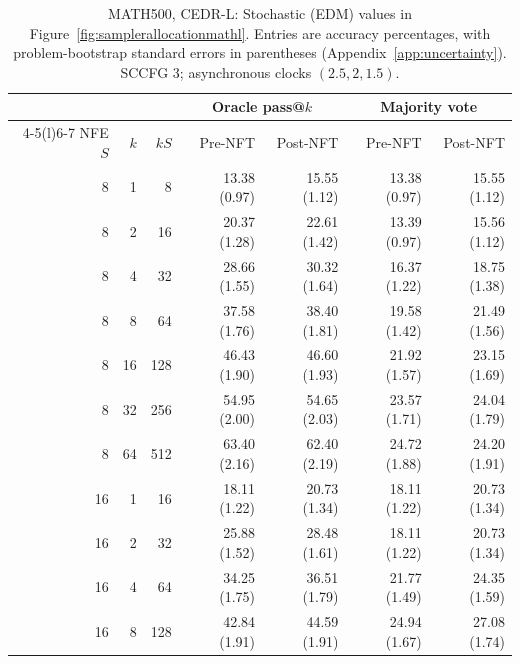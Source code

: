 \documentclass[11pt,letterpaper]{article}
\begin{document}
\begin{table}[p]
\centering\small
\setlength{\tabcolsep}{5pt}
\caption{MATH500, CEDR-L: Stochastic (EDM) values in Figure~\ref{fig:samplerallocationmathl}. Entries are accuracy percentages, with problem-bootstrap standard errors in parentheses (Appendix~\ref{app:uncertainty}). SCCFG 3; asynchronous clocks $(2.5,2,1.5)$.}
\label{tab:samplerbudgetmathledm}
\begin{tabular}{@{}rrr rrrr@{}}
\toprule
& & & \multicolumn{2}{c}{Oracle pass@$k$} & \multicolumn{2}{c}{Majority vote} \\
\cmidrule(lr){4-5}\cmidrule(l){6-7}
NFE $S$ & $k$ & $kS$ & Pre-NFT & Post-NFT & Pre-NFT & Post-NFT \\
\midrule
8 & 1 & 8 & 13.38 {\scriptsize (0.97)} & 15.55 {\scriptsize (1.12)} & 13.38 {\scriptsize (0.97)} & 15.55 {\scriptsize (1.12)} \\
8 & 2 & 16 & 20.37 {\scriptsize (1.28)} & 22.61 {\scriptsize (1.42)} & 13.39 {\scriptsize (0.97)} & 15.56 {\scriptsize (1.12)} \\
8 & 4 & 32 & 28.66 {\scriptsize (1.55)} & 30.32 {\scriptsize (1.64)} & 16.37 {\scriptsize (1.22)} & 18.75 {\scriptsize (1.38)} \\
8 & 8 & 64 & 37.58 {\scriptsize (1.76)} & 38.40 {\scriptsize (1.81)} & 19.58 {\scriptsize (1.42)} & 21.49 {\scriptsize (1.56)} \\
8 & 16 & 128 & 46.43 {\scriptsize (1.90)} & 46.60 {\scriptsize (1.93)} & 21.92 {\scriptsize (1.57)} & 23.15 {\scriptsize (1.69)} \\
8 & 32 & 256 & 54.95 {\scriptsize (2.00)} & 54.65 {\scriptsize (2.03)} & 23.57 {\scriptsize (1.71)} & 24.04 {\scriptsize (1.79)} \\
8 & 64 & 512 & 63.40 {\scriptsize (2.16)} & 62.40 {\scriptsize (2.19)} & 24.72 {\scriptsize (1.88)} & 24.20 {\scriptsize (1.91)} \\
\midrule
16 & 1 & 16 & 18.11 {\scriptsize (1.22)} & 20.73 {\scriptsize (1.34)} & 18.11 {\scriptsize (1.22)} & 20.73 {\scriptsize (1.34)} \\
16 & 2 & 32 & 25.88 {\scriptsize (1.52)} & 28.48 {\scriptsize (1.61)} & 18.11 {\scriptsize (1.22)} & 20.73 {\scriptsize (1.34)} \\
16 & 4 & 64 & 34.25 {\scriptsize (1.75)} & 36.51 {\scriptsize (1.79)} & 21.77 {\scriptsize (1.49)} & 24.35 {\scriptsize (1.59)} \\
16 & 8 & 128 & 42.84 {\scriptsize (1.91)} & 44.59 {\scriptsize (1.91)} & 24.94 {\scriptsize (1.67)} & 27.08 {\scriptsize (1.74)} \\

\end{tabular}
\end{table}
\end{document}
